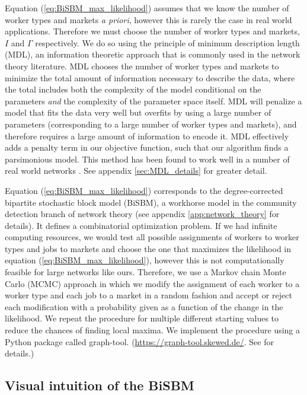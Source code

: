 \documentclass[12pt]{article}
\theoremstyle{definition}
\theoremstyle{plain}
\begin{document}
Equation (\ref{eq:BiSBM_max_likelihood}) assumes that we know the number of worker types and markets \emph{a priori}, however this is rarely the case in real world applications. Therefore we must choose the number of worker types and markets, $I$ and $\Gamma$ respectively. We do so using the principle of minimum description length (MDL), an information theoretic approach that is commonly used in the network theory literature. MDL chooses the number of worker types and markets to minimize the total amount of information necessary to describe the data, where the total includes both the complexity of the model conditional on the parameters \emph{and} the complexity of the parameter space itself. MDL will penalize a model that fits the data very well but overfits by using a large number of parameters (corresponding to a large number of worker types and markets), and therefore requires a large amount of information to encode it. MDL effectively adds a penalty term in our objective function, such that our algorithm finds a parsimonious model. This method has been found to work well in a number of real world networks \citep{Peixoto2013,Peixoto2014,RosvallBergstrom2007}. See appendix \ref{sec:MDL_details} for greater detail.



Equation (\ref{eq:BiSBM_max_likelihood}) corresponds to the degree-corrected bipartite stochastic block model (BiSBM), a workhorse model in the community detection branch of network theory (see appendix \ref{app:network_theory} for details). It defines a combinatorial optimization problem. If we had infinite computing resources, we would test all possible  assignments of workers to worker types and jobs to markets and choose the one that maximizes the likelihood in equation (\ref{eq:BiSBM_max_likelihood}), however this is not computationally feasible for large networks like ours. Therefore, we use a Markov chain Monte Carlo (MCMC) approach in which we modify the assignment of each worker to a worker type and each job to a market in a random fashion and accept or reject each modification with a probability given as a function of the change in the likelihood. We repeat the procedure for multiple different starting values to reduce the chances of finding local maxima. We implement the procedure using a Python package called graph-tool. (\url{https://graph-tool.skewed.de/}. See \citet{Peixoto2014_efficient} for details.)



\subsection{Visual intuition of the BiSBM}
\end{document}
